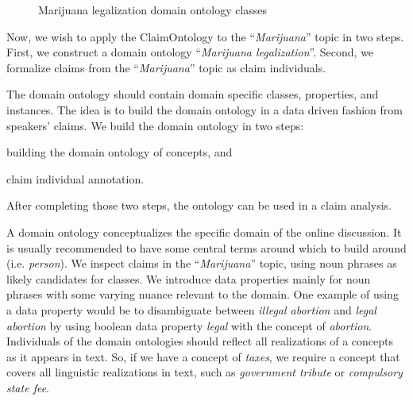 \begin{figure}
	\centering
{}

\caption{Marijuana legalization domain ontology classes}
\label{fig:marijuana_domain_ontology}
\end{figure}


Now, we wish to apply the ClaimOntology to the ``\emph{Marijuana}'' topic in
two steps.  First, we construct a domain ontology ``\emph{Marijuana
legalization}''.  Second, we formalize claims from the ``\emph{Marijuana}''
topic as claim individuals. 

The domain ontology should contain domain specific classes, properties, and
instances. The idea is to build the domain ontology in a data driven 
fashion from speakers' claims. We build the domain ontology in two steps:
\begin{enumerate*}[label=(\arabic*)]
\item building the domain ontology of concepts, and 
\item claim individual annotation. 
\end{enumerate*}
After completing those two steps, the ontology can be used in a claim analysis. 

A domain ontology conceptualizes the specific domain of the online discussion. 
It is usually recommended to have some central terms around which to build
around (i.e. \emph{person}). We inspect claims in the ``\emph{Marijuana}'' topic,
using noun phrases as likely candidates for classes. We introduce
data properties mainly for noun phrases with some varying nuance relevant to
the domain. One example of using a data property would be to disambiguate between
\emph{illegal abortion} and \emph{legal abortion} by using boolean data
property \emph{legal} with the concept of \emph{abortion}.
Individuals of the domain ontologies should reflect all realizations of a concepts as
it appears in text. So, if we have a concept of \emph{taxes}, we require a concept
that covers all linguistic realizations in text, such as \emph{government tribute} or
\emph{compulsory state fee}. 

